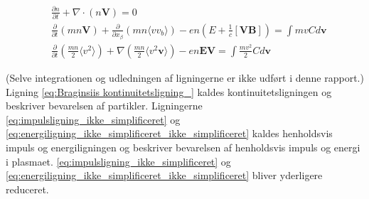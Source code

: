 \begin{align}
    &\frac{\partial n}{\partial t} + \nabla \cdot (n \mathbf{V}) = 0 \label{eq:Braginsiis kontinuitetsligning_}\\
    &\frac{\partial}{\partial t}\left(m n \mathbf{V}\right) + \frac{\partial}{\partial x_\beta} \left(m n \langle v v_b \rangle \right) 
    - en\left(E + \frac{1}{c} \left[\mathbf{VB}\right]\right) = \int mv C d\mathbf{v} \label{eq:impulsligning_ikke_simplificeret}\\
    &\frac{\partial}{\partial t} \left(\frac{mn}{2} \langle v^2 \rangle\right)  + \nabla \left(\frac{m n}{2} \langle v^2\mathbf{v} \rangle \right)
    -en\mathbf{EV} = \int \frac{mv^2}{2}Cd\mathbf{v} \label{eq:energiligning_ikke_simplificeret_ikke_simplificeret}
\end{align}

(Selve integrationen og udledningen af ligningerne er ikke udført i denne rapport.)
Ligning \eqref{eq:Braginsiis kontinuitetsligning_} kaldes kontinuitetsligningen og beskriver bevarelsen af partikler.
Ligningerne \eqref{eq:impulsligning_ikke_simplificeret} og \eqref{eq:energiligning_ikke_simplificeret_ikke_simplificeret}
kaldes henholdsvis impuls og energiligningen og beskriver bevarelsen af henholdsvis impuls og energi i plasmaet.
\eqref{eq:impulsligning_ikke_simplificeret} og \eqref{eq:energiligning_ikke_simplificeret_ikke_simplificeret} bliver yderligere 
reduceret. 

